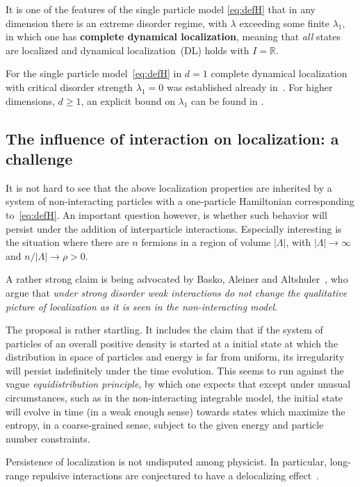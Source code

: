 \documentclass[reqno,keywordsasfootnote]{article}
\numberwithin{equation}{section}
\theoremstyle{definition}
\begin{document}
It is one of the features of the single particle model \eqref{eq:defH} that in any dimension there is an extreme disorder regime, with $\lambda $ exceeding some finite $ \lambda_1$,  in which  one has 
{\bf complete dynamical localization}, meaning that {\it all} states are localized and  
dynamical localization~(DL) holds with $ I = \mathbb{R} $.

For the single particle model~\eqref{eq:defH} in $ d = 1 $ complete dynamical localization with critical disorder strength $ \lambda_1 = 0 $ 
was established  already in~\cite{KuSou80}. For higher dimensions, $ d \geq 1 $, an explicit bound on $ \lambda_1 $ can be found in \cite{A2}.  

\subsection{The influence of interaction on localization: a challenge} 
It is not hard to see that the above localization properties are inherited by a system of non-interacting particles with a one-particle Hamiltonian corresponding to~\eqref{eq:defH}.  
An important question however, is whether such behavior will persist under the addition of interparticle interactions.  
Especially interesting is the situation where there are $n$ fermions in a region of volume $|\Lambda|$, with 
$|\Lambda| \to \infty$ and  $n/|\Lambda| \to \rho >0$.  

A rather strong claim is being advocated by Basko, Aleiner and Altshuler~\cite{BAA06}, who argue that \emph{under strong disorder weak interactions do not change the qualitative picture of localization  as it is seen in the non-interacting model}.    

The proposal is rather startling.  It includes the claim that if the system of particles of an overall positive density is started at a initial state at which the distribution in space of particles and energy is far from uniform, its irregularity will persist indefinitely under the time evolution.   This seems to run against the vague \emph{equidistribution principle}, by which one expects that 
except under unusual circumstances, such as in the non-interacting integrable model, the initial state will evolve in time (in a weak enough sense) towards states which maximize the entropy, in a coarse-grained sense, subject to the given energy and particle number constraints.  

Persistence of localization is not undisputed among physicist. In particular,    
long-range repulsive interactions are conjectured to have a delocalizing effect~\cite{Shep}. 
\end{document}
